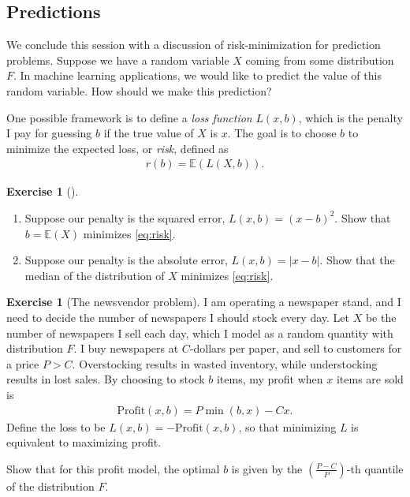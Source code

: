 \documentclass[11pt]{article}
\theoremstyle{definition}
\newtheorem{exercise}[]{Exercise}
\newcommand{\E}{\mathbb{E}}
\begin{document}
\subsection{Predictions}

We conclude this session with a discussion of risk-minimization for prediction problems.
Suppose we have a random variable $X$ coming from some distribution $F$.
In machine learning applications, we would like to predict the value of this random variable.
How should we make this prediction?

One possible framework is to define a \textit{loss function} $L(x, b)$, which is
the penalty I pay for guessing $b$ if the true value of $X$ is $x$.
The goal is to choose $b$ to minimize the expected loss, or \textit{risk}, defined as
\begin{align}
  r(b) = \E(L(X, b)).
  \label{eq:risk}
\end{align}

\begin{exercise}[]
  $\quad$\vspace{-1em}

  \begin{enumerate}[label = (\alph*)]
    \item Suppose our penalty is the squared error, $L(x, b) = (x - b)^2$. Show that $b = \E(X)$ minimizes
    \eqref{eq:risk}.
    \item Suppose our penalty is the absolute error, $L(x, b) = |x - b|$. Show that the median of the
    distribution of $X$ minimizes \eqref{eq:risk}.
  \end{enumerate}
\end{exercise}


\begin{exercise}[The newsvendor problem]
  I am operating a newspaper stand, and I need to decide the number of newspapers
  I should stock every day.
  Let $X$ be the number of newspapers I sell each day, which I model as
  a random quantity with
  distribution $F$.
  I buy newspapers at $C$-dollars per paper, and sell to customers for a price $P > C$.
  Overstocking results in wasted inventory, while understocking results in lost sales.
  By choosing to stock $b$ items, my profit when $x$ items
  are sold is
  \begin{align}
    \textrm{Profit}(x, b) = P\min(b, x) - Cx.
  \end{align}
  Define the loss to be $L(x, b) = - \textrm{Profit}(x, b)$, so that
  minimizing $L$ is equivalent to maximizing profit.

  Show that for this profit model, the optimal $b$ is given by the $(\frac{P - C}{P})$-th
  quantile of the distribution $F$.

\end{exercise}
\end{document}

